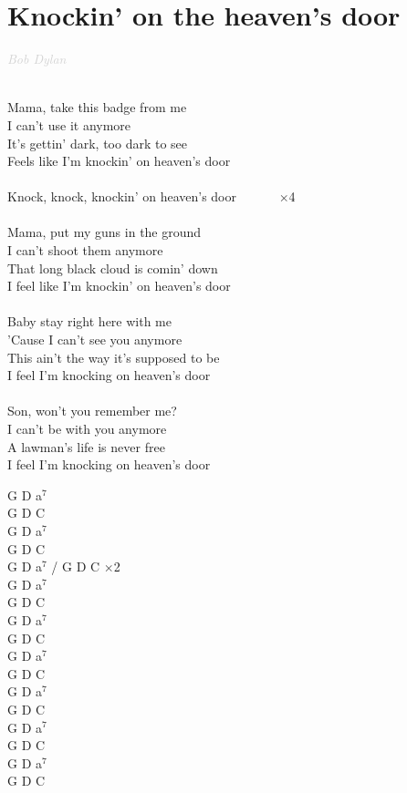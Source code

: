 \documentclass[a5paper, 10pt]{book}
\begin{document}
\newpage
\section{Knockin' on the heaven's door}\textcolor{lightgray}{\textit{Bob Dylan}}\\~\\
\begin{minipage}[t]{0.7\textwidth}
Mama, take this badge from me				\\
I can't use it anymore		\\
It's gettin' dark, too dark to see\\
Feels like I'm knockin' on heaven's door\\
\\
\hspace*{5mm}Knock, knock, knockin' on heaven's door ~~~~~~$\times$4\\
\\
Mama, put my guns in the ground\\
I can't shoot them anymore\\
That long black cloud is comin' down\\
I feel like I'm knockin' on heaven's door\\
\\
Baby stay right here with me\\
'Cause I can't see you anymore\\
This ain't the way it's supposed to be\\
I feel I'm knocking on heaven's door\\
\\
Son, won't you remember me?\\
I can't be with you anymore\\
A lawman's life is never free\\
I feel I'm knocking on heaven's door\\
\end{minipage}
\begin{minipage}[t]{0.3\textwidth}
G D a$^7$\\
G D C\\
G D a$^7$\\
G D C\\

G D a$^7$ / G D C $\times$2\\

G D a$^7$\\
G D C\\
G D a$^7$\\
G D C\\

G D a$^7$\\
G D C\\
G D a$^7$\\
G D C\\

G D a$^7$\\
G D C\\
G D a$^7$\\
G D C\\

\end{minipage}
\end{document}
